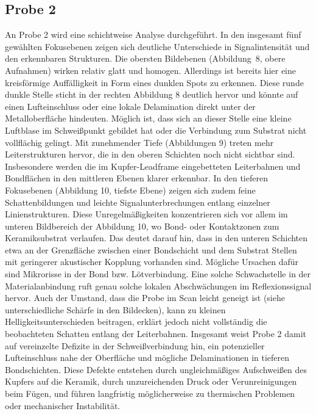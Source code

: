 \subsection{Probe 2}
An Probe 2 wird eine schichtweise Analyse durchgeführt. In den insgesamt fünf gewählten Fokusebenen zeigen sich deutliche Unterschiede in Signalintensität und den erkennbaren Strukturen. Die obersten Bildebenen (Abbildung 8, obere Aufnahmen) wirken relativ glatt und homogen. Allerdings ist bereits hier eine kreisförmige Auffälligkeit in Form eines dunklen Spots zu erkennen. Diese runde dunkle Stelle sticht in der rechten Abbildung 8 deutlich hervor und könnte auf einen Lufteinschluss oder eine lokale Delamination direkt unter der Metalloberfläche hindeuten. Möglich ist, dass sich an dieser Stelle eine kleine Luftblase im Schweißpunkt gebildet hat oder die Verbindung zum Substrat nicht vollflächig gelingt. Mit zunehmender Tiefe (Abbildungen 9) treten mehr Leiterstrukturen hervor, die in den oberen Schichten noch nicht sichtbar sind. Insbesondere werden die im Kupfer-Leadframe eingebetteten Leiterbahnen und Bondflächen in den mittleren Ebenen klarer erkennbar. In den tieferen Fokusebenen (Abbildung 10, tiefste Ebene) zeigen sich zudem feine Schattenbildungen und leichte Signalunterbrechungen entlang einzelner Linienstrukturen. Diese Unregelmäßigkeiten konzentrieren sich vor allem im unteren Bildbereich der Abbildung 10, wo Bond- oder Kontaktzonen zum Keramiksubstrat verlaufen. Das deutet darauf hin, dass in den unteren Schichten etwa an der Grenzfläche zwischen einer Bondschicht und dem Substrat Stellen mit geringerer akustischer Kopplung vorhanden sind. Mögliche Ursachen dafür sind Mikrorisse in der Bond bzw. Lötverbindung. Eine solche Schwachstelle in der Materialanbindung ruft genau solche lokalen Abschwächungen im Reflexionssignal hervor. Auch der Umstand, dass die Probe im Scan leicht geneigt ist (siehe unterschiedliche Schärfe in den Bildecken), kann zu kleinen Helligkeitsunterschieden beitragen, erklärt jedoch nicht vollständig die beobachteten Schatten entlang der Leiterbahnen. Insgesamt weist Probe 2 damit auf vereinzelte Defizite in der Schweißverbindung hin, ein potenzieller Lufteinschluss nahe der Oberfläche und mögliche Delaminationen in tieferen Bondschichten. Diese Defekte entstehen durch ungleichmäßiges Aufschweißen des Kupfers auf die Keramik, durch unzureichenden Druck oder Verunreinigungen beim Fügen, und führen langfristig möglicherweise zu thermischen Problemen oder mechanischer Instabilität.
\vspace{0.2cm}

